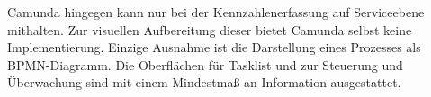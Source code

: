 \smallskip\noindent Camunda hingegen kann nur bei der Kennzahlenerfassung auf Serviceebene mithalten. Zur visuellen Aufbereitung dieser bietet Camunda selbst keine Implementierung. Einzige Ausnahme ist die Darstellung eines Prozesses als \ac{BPMN}-Diagramm. Die Oberflächen für Tasklist und zur Steuerung und Überwachung sind mit einem Mindestmaß an Information ausgestattet.





